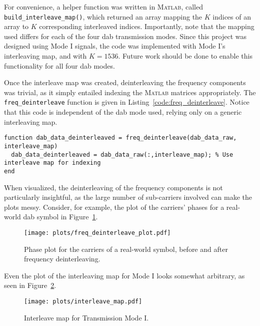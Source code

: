 \documentclass[class=report,11pt,crop=false]{standalone}
\begin{document}
For convenience, a helper function was written in \textsc{Matlab}, called \texttt{build\_interleave\_map()}, which returned an array mapping the \(K\) indices of an array to \(K\) corresponding interleaved indices. Importantly, note that the mapping used differs for each of the four \gls{dab} transmission modes. Since this project was designed using Mode I signals, the code was implemented with Mode I's interleaving map, and with \(K = 1536\). Future work should be done to enable this functionality for all four \gls{dab} modes.

Once the interleave map was created, deinterleaving the frequency components was trivial, as it simply entailed indexing the \textsc{Matlab} matrices appropriately. The \texttt{freq\_deinterleave} function is given in Listing~\ref{code:freq_deinterleave}. Notice that this code is independent of the \gls{dab} mode used, relying only on a generic interleaving map.

\begin{lstlisting}[caption={\textsc{Matlab} code for the frequency deinterleaving functionality.},label={code:freq_deinterleave}]
function dab_data_deinterleaved = freq_deinterleave(dab_data_raw, interleave_map)
  dab_data_deinterleaved = dab_data_raw(:,interleave_map); % Use interleave map for indexing
end
\end{lstlisting}

When visualized, the deinterleaving of the frequency components is not particularly insightful, as the large number of sub-carriers involved can make the plots messy. Consider, for example, the plot of the carriers' phases for a real-world \gls{dab} symbol in Figure~\ref{fig:freq_deinterleave_plot}.

\begin{figure}[htbp]
  \centering
  \captionsetup{type=figure}
  \texttt{[image: plots/freq\_deinterleave\_plot.pdf]}
  \caption{Phase plot for the carriers of a real-world  symbol, before and after frequency deinterleaving.}
  \label{fig:freq_deinterleave_plot}
\end{figure}

Even the plot of the interleaving map for Mode I looks somewhat arbitrary, as seen in Figure~\ref{fig:interleave_map}.

\begin{figure}[htbp]
  \centering
  \captionsetup{type=figure}
  \texttt{[image: plots/interleave\_map.pdf]}
  \caption{Interleave map for  Transmission Mode I.}
  \label{fig:interleave_map}
\end{figure}
\end{document}
